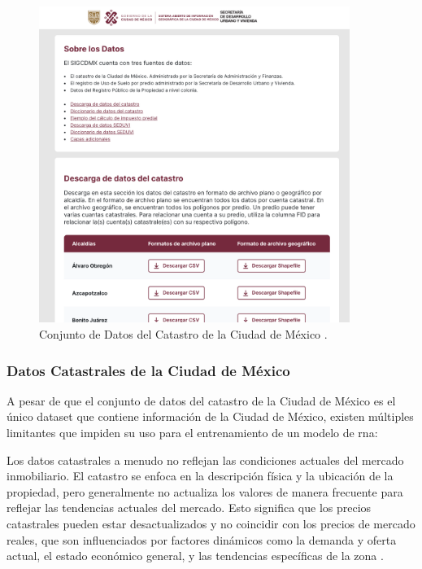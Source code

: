 \begin{figure}[!htbp]
  \centering
  \includegraphics[width=0.9\textwidth]{imagenes/02-marco-teorico/catastro-cdmx.png}
  \caption[Conjunto de Datos del Catastro de la Ciudad de México]{Conjunto de Datos del Catastro de la Ciudad de México \cite{sigcdmx}.}
  \label{fig:catastro-cdmx}
\end{figure}

\subsubsection{Datos Catastrales de la Ciudad de México}

A pesar de que el conjunto de datos del catastro de la Ciudad de México es el
único \gls{dataset} que contiene información de la Ciudad de México, existen
múltiples limitantes que impiden su uso para el entrenamiento de un modelo de
\acrshort{rna}:

Los datos catastrales a menudo no reflejan las condiciones actuales del
mercado inmobiliario. El catastro se enfoca en la descripción física y la
ubicación de la propiedad, pero generalmente no actualiza los valores de manera
frecuente para reflejar las tendencias actuales del mercado. Esto significa que
los precios catastrales pueden estar desactualizados y no coincidir con los
precios de mercado reales, que son influenciados por factores dinámicos como la
demanda y oferta actual, el estado económico general, y las tendencias específicas
de la zona \cite{eguino2020catastro}.

